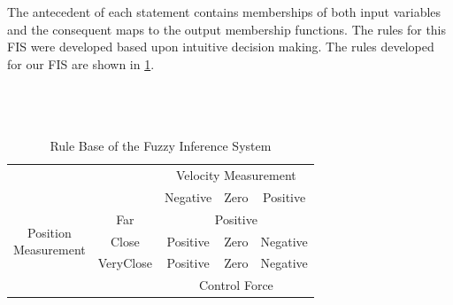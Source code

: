 The antecedent of each statement contains memberships of both input variables and the consequent maps to the
output membership functions. The rules for this FIS were developed based upon intuitive decision making. The
rules developed for our FIS are shown in \cref{tab:rulebase}.  \\ \\ \\ \\ \begin{table}[h]
    \begin{center} \caption{Rule Base of the Fuzzy Inference System}\label{tab:rulebase}
        \begin{tabular}{ccccc} \multicolumn{2}{c}{}  & \multicolumn{3}{c}{Velocity Measurement}\\ \cline{3-5}
            \multicolumn{2}{c|}{}  & \multicolumn{1}{c|}{Negative} & \multicolumn{1}{c|}{Zero} &
            \multicolumn{1}{c|}{Positive} \\ \cline{2-5}
            \multicolumn{1}{c|}{\multirow{3}{*}{\parbox{3cm}{\centering Position\\Measurement}}} &
            \multicolumn{1}{c|}{Far} & \multicolumn{3}{c|}{Positive} \\ \cline{2-5} \multicolumn{1}{c|}{} &
            \multicolumn{1}{c|}{Close} & \multicolumn{1}{c|}{Positive} & \multicolumn{1}{c|}{Zero} &
            \multicolumn{1}{c|}{Negative}\\ \cline{2-5} \multicolumn{1}{c|}{} & \multicolumn{1}{c|}{VeryClose}
                                                                              & \multicolumn{1}{c|}{Positive}
                                                                              & \multicolumn{1}{c|}{Zero} &
            \multicolumn{1}{c|}{Negative} \\ \cline{2-5} \multicolumn{2}{c}{}  & \multicolumn{3}{c}{Control
        Force} \end{tabular} \end{center} \end{table}

